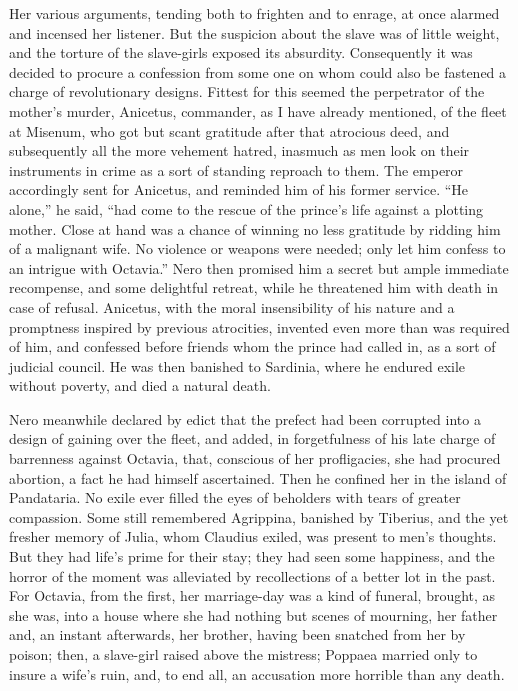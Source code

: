 Her various arguments, tending both to frighten and to enrage, at once alarmed and incensed her listener. But the suspicion about the slave was of little weight, and the torture of the slave-girls exposed its absurdity. Consequently it was decided to procure a confession from some one on whom could also be fastened a charge of revolutionary designs. Fittest for this seemed the perpetrator of the mother's murder, Anicetus, commander, as I have already mentioned, of the fleet at Misenum, who got but scant gratitude after that atrocious deed, and subsequently all the more vehement hatred, inasmuch as men look on their instruments in crime as a sort of standing reproach to them. The emperor accordingly sent for Anicetus, and reminded him of his former service. ``He alone,'' he said, ``had come to the rescue of the prince's life against a plotting mother. Close at hand was a chance of winning no less gratitude by ridding him of a malignant wife. No violence or weapons were needed; only let him confess to an intrigue with Octavia.'' Nero then promised him a secret but ample immediate recompense, and some delightful retreat, while he threatened him with death in case of refusal. Anicetus, with the moral insensibility of his nature and a promptness inspired by previous atrocities, invented even more than was required of him, and confessed before friends whom the prince had called in, as a sort of judicial council. He was then banished to Sardinia, where he endured exile without poverty, and died a natural death.


Nero meanwhile declared by edict that the prefect had been corrupted into a design of gaining over the fleet, and added, in forgetfulness of his late charge of barrenness against Octavia, that, conscious of her profligacies, she had procured abortion, a fact he had himself ascertained. Then he confined her in the island of Pandataria. No exile ever filled the eyes of beholders with tears of greater compassion. Some still remembered Agrippina, banished by Tiberius, and the yet fresher memory of Julia, whom Claudius exiled, was present to men's thoughts. But they had life's prime for their stay; they had seen some happiness, and the horror of the moment was alleviated by recollections of a better lot in the past. For Octavia, from the first, her marriage-day was a kind of funeral, brought, as she was, into a house where she had nothing but scenes of mourning, her father and, an instant afterwards, her brother, having been snatched from her by poison; then, a slave-girl raised above the mistress; Poppaea married only to insure a wife's ruin, and, to end all, an accusation more horrible than any death.

